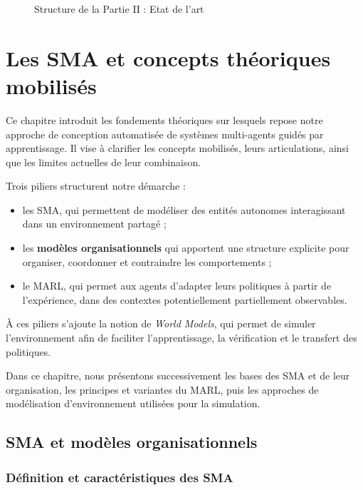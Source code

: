 \begin{figure}[h!]
    \centering
    \resizebox{\textwidth}{!}{%
        
    }
    \caption{Structure de la Partie II : Etat de l'art}
    \label{fig:organisation_manuscrit_partie_2}
\end{figure}

\chapter{Les SMA et concepts théoriques mobilisés}
\label{chap:concepts}

\noindent
Ce chapitre introduit les fondements théoriques sur lesquels repose notre approche de conception automatisée de systèmes multi-agents guidés par apprentissage. Il vise à clarifier les concepts mobilisés, leurs articulations, ainsi que les limites actuelles de leur combinaison.

Trois piliers structurent notre démarche :
\begin{itemize}
    \item les \ac{SMA}, qui permettent de modéliser des entités autonomes interagissant dans un environnement partagé ;
    \item les \textbf{modèles organisationnels} qui apportent une structure explicite pour organiser, coordonner et contraindre les comportements ;
    \item le \ac{MARL}, qui permet aux agents d'adapter leurs politiques à partir de l'expérience, dans des contextes potentiellement partiellement observables.
\end{itemize}

À ces piliers s'ajoute la notion de \textit{World Models}, qui permet de simuler l'environnement afin de faciliter l'apprentissage, la vérification et le transfert des politiques.

Dans ce chapitre, nous présentons successivement les bases des \ac{SMA} et de leur organisation, les principes et variantes du \ac{MARL}, puis les approches de modélisation d'environnement utilisées pour la simulation.


\section{SMA et modèles organisationnels}

\subsection{Définition et caractéristiques des SMA}

